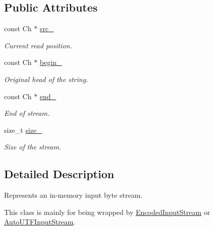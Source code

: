 \subsection*{Public Attributes}
\begin{DoxyCompactItemize}
\item 
\mbox{\label{struct_memory_stream_a57cf6cb5766e931a62928b9f92507443}} 
const Ch $\ast$ \hyperlink{struct_memory_stream_a57cf6cb5766e931a62928b9f92507443}{src\+\_\+}
\begin{DoxyCompactList}\small\item\em Current read position. \end{DoxyCompactList}\item 
\mbox{\label{struct_memory_stream_a91f0767b4f0ed2476d835e8344848a2f}} 
const Ch $\ast$ \hyperlink{struct_memory_stream_a91f0767b4f0ed2476d835e8344848a2f}{begin\+\_\+}
\begin{DoxyCompactList}\small\item\em Original head of the string. \end{DoxyCompactList}\item 
\mbox{\label{struct_memory_stream_a55fb302ba0492419757e3ba318c8c654}} 
const Ch $\ast$ \hyperlink{struct_memory_stream_a55fb302ba0492419757e3ba318c8c654}{end\+\_\+}
\begin{DoxyCompactList}\small\item\em End of stream. \end{DoxyCompactList}\item 
\mbox{\label{struct_memory_stream_ab26a1b5c6d5e8f52c0f6982feba47f36}} 
size\+\_\+t \hyperlink{struct_memory_stream_ab26a1b5c6d5e8f52c0f6982feba47f36}{size\+\_\+}
\begin{DoxyCompactList}\small\item\em Size of the stream. \end{DoxyCompactList}\end{DoxyCompactItemize}


\subsection{Detailed Description}
Represents an in-\/memory input byte stream. 

This class is mainly for being wrapped by \hyperlink{class_encoded_input_stream}{Encoded\+Input\+Stream} or \hyperlink{class_auto_u_t_f_input_stream}{Auto\+U\+T\+F\+Input\+Stream}.

